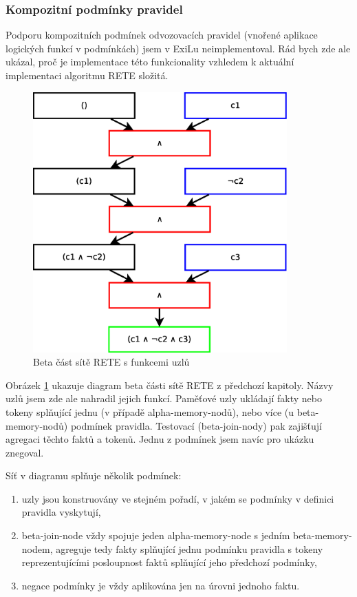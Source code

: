 \subsubsection{Kompozitní podmínky pravidel}
\label{composite conditions}

Podporu kompozitních podmínek odvozovacích pravidel (vnořené aplikace logických
funkcí v podmínkách) jsem v ExiLu neimplementoval. Rád bych zde ale ukázal, proč
je implementace této funkcionality vzhledem k aktuální implementaci algoritmu
RETE složitá.

\begin{figure}[h]
\centering
\includegraphics[height=10cm]{rete-beta-conds.eps}
\caption{Beta část sítě RETE s funkcemi uzlů}
\label{rete-beta-conds}
\end{figure}

Obrázek \ref{rete-beta-conds} ukazuje diagram beta části sítě RETE z předchozí
kapitoly. Názvy uzlů jsem zde ale nahradil jejich funkcí. Paměťové uzly ukládají
fakty nebo tokeny splňující jednu (v případě alpha-memory-nodů), nebo více (u
beta-memory-nodů) podmínek pravidla. Testovací (beta-join-nody) pak zajišťují
agregaci těchto faktů a tokenů. Jednu z podmínek jsem navíc pro ukázku znegoval.

Síť v diagramu splňuje několik podmínek:
\begin{enumerate}
  \item uzly jsou konstruovány ve stejném pořadí, v jakém se podmínky v definici
    pravidla vyskytují,
  \item beta-join-node vždy spojuje jeden alpha-memory-node s jedním
    beta-memory-nodem, agreguje tedy fakty splňující jednu podmínku pravidla s
    tokeny reprezentujícími posloupnost faktů splňující jeho předchozí podmínky,
  \item negace podmínky je vždy aplikována jen na úrovni jednoho faktu.
\end{enumerate}

